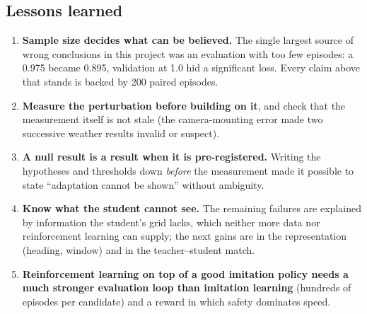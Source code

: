 \subsection{Lessons learned}
\begin{enumerate}
\item \textbf{Sample size decides what can be believed.} The single largest source of wrong conclusions in this project was an evaluation with too few episodes: a 0.975 became 0.895, validation at 1.0 hid a significant loss. Every claim above that stands is backed by 200 paired episodes.
\item \textbf{Measure the perturbation before building on it}, and check that the measurement itself is not stale (the camera-mounting error made two successive weather results invalid or suspect).
\item \textbf{A null result is a result when it is pre-registered.} Writing the hypotheses and thresholds down \emph{before} the measurement made it possible to state ``adaptation cannot be shown'' without ambiguity.
\item \textbf{Know what the student cannot see.} The remaining failures are explained by information the student's grid lacks, which neither more data nor reinforcement learning can supply; the next gains are in the representation (heading, window) and in the teacher--student match.
\item \textbf{Reinforcement learning on top of a good imitation policy needs a much stronger evaluation loop than imitation learning} (hundreds of episodes per candidate) and a reward in which safety dominates speed.
\end{enumerate}
